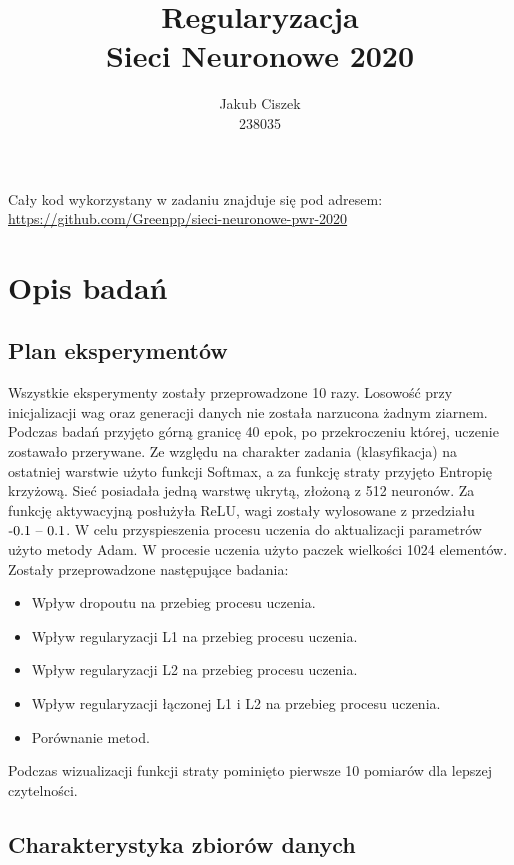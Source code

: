 \documentclass{article}
\title{  Regularyzacja\\Sieci Neuronowe 2020 }
\author{
  Jakub Ciszek \\
  238035\\
}
\begin{document}
\maketitle

\newpage
\tableofcontents
\newpage

Cały kod wykorzystany w zadaniu znajduje się pod adresem: \url{https://github.com/Greenpp/sieci-neuronowe-pwr-2020}

\section{Opis badań}
\subsection{Plan eksperymentów}

Wszystkie eksperymenty zostały przeprowadzone 10 razy. Losowość przy inicjalizacji wag oraz generacji danych nie została narzucona żadnym ziarnem. Podczas badań przyjęto górną granicę 40 epok, po przekroczeniu której, uczenie zostawało przerywane. Ze względu na charakter zadania (klasyfikacja) na ostatniej warstwie użyto funkcji Softmax, a za funkcję straty przyjęto Entropię krzyżową. Sieć posiadała jedną warstwę ukrytą, złożoną z 512 neuronów. Za funkcję aktywacyjną posłużyła ReLU, wagi zostały wylosowane z przedziału \($-0.1 -- 0.1$\). W celu przyspieszenia procesu uczenia do aktualizacji parametrów użyto metody Adam.
W procesie uczenia użyto paczek wielkości 1024 elementów.\\
Zostały przeprowadzone następujące badania:
\begin{itemize}
	\item Wpływ dropoutu na przebieg procesu uczenia.
	\item Wpływ regularyzacji L1 na przebieg procesu uczenia.
	\item Wpływ regularyzacji L2 na przebieg procesu uczenia.
	\item Wpływ regularyzacji łączonej L1 i L2 na przebieg procesu uczenia.
	\item Porównanie metod.
\end{itemize}
Podczas wizualizacji funkcji straty pominięto pierwsze 10 pomiarów dla lepszej czytelności.

\subsection{Charakterystyka zbiorów danych}
\end{document}
